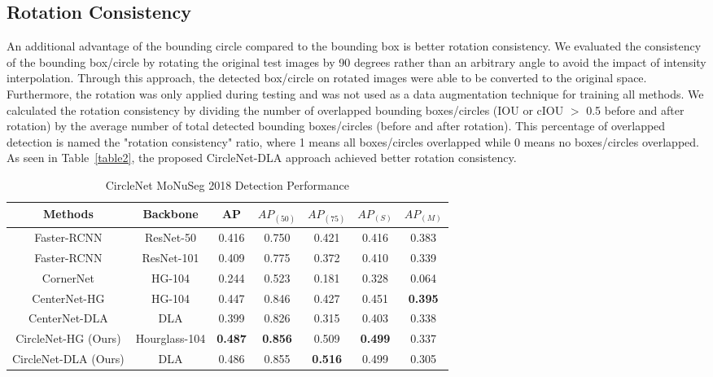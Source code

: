 \documentclass[journal]{IEEEtran}
\newcommand{\Tab}{Table}
\begin{document}
\subsection{Rotation Consistency}
An additional advantage of the bounding circle compared to the bounding box is better rotation consistency. We evaluated the consistency of the bounding box/circle by rotating the original test images by 90 degrees rather than an arbitrary angle to avoid the impact of intensity interpolation. Through this approach, the detected box/circle on rotated images were able to be converted to the original space. Furthermore, the rotation was only applied during testing and was not used as a data augmentation technique for training all methods. We calculated the rotation consistency by dividing the number of overlapped bounding boxes/circles (IOU or cIOU $>$ 0.5 before and after rotation) by the average number of total detected bounding boxes/circles (before and after rotation). This percentage of overlapped detection is named the "rotation consistency" ratio, where 1 means all boxes/circles overlapped while 0 means no boxes/circles overlapped. As seen in \Tab~\ref{table2}, the proposed CircleNet-DLA approach achieved better rotation consistency.

\begin{table*}
\caption{CircleNet MoNuSeg 2018 Detection Performance}
\centering
\begin{tabular}{ccccccc}
\hline
Methods & Backbone & AP & $AP_{(50)}$ & $AP_{(75)}$ & $AP_{(S)}$ & $AP_{(M)}$\\
 \hline
Faster-RCNN\cite{ren2015faster} & ResNet-50 & 0.416 & 0.750 & 0.421 & 0.416 & 0.383\\
Faster-RCNN\cite{ren2015faster} & ResNet-101 & 0.409 & 0.775 & 0.372 & 0.410 & 0.339\\
CornerNet\cite{law2018cornernet}& HG-104 & 0.244 & 0.523 & 0.181 & 0.328 & 0.064\\
CenterNet-HG\cite{zhou2019objects} &  HG-104 & 0.447 & 0.846 & 0.427 & 0.451 &\textbf{0.395}\\
CenterNet-DLA\cite{zhou2019objects} & DLA & 0.399 & 0.826 & 0.315 & 0.403 & 0.338\\
 \hline
 CircleNet-HG (Ours) & Hourglass-104  & \textbf{0.487} & \textbf{0.856} & 0.509 & \textbf{0.499} & 0.337\\
CircleNet-DLA (Ours) & DLA & 0.486 & 0.855 & \textbf{0.516} & 0.499 & 0.305\\
 \hline
\end{tabular}
\label{table3}
\end{table*}
\end{document}
